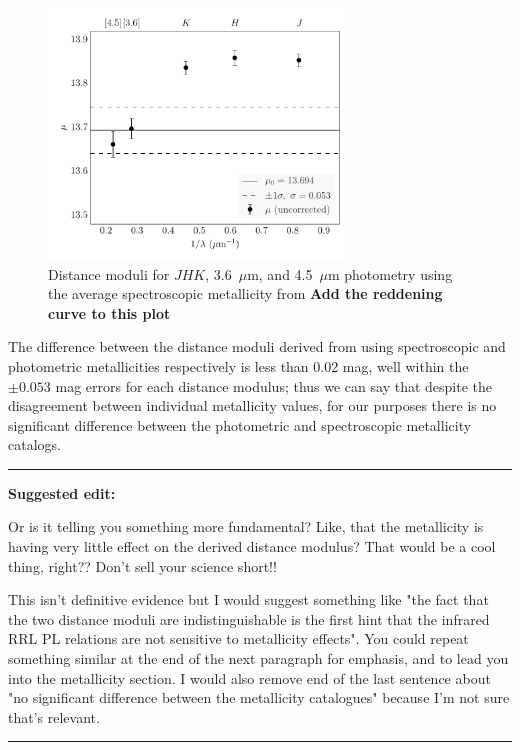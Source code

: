 \documentclass[a4paper,fleqn,usenatbib]{mnras}
\begin{document}
\begin{figure}
\begin{center}
\includegraphics[width=80mm]{final_plots/multiwavelength_distance_samestars_spect.pdf}
\caption{Distance moduli for $J\!H\!K$, 3.6~$\mu$m, and 4.5~$\mu$m photometry using the average spectroscopic metallicity from\citet{2006ApJ...640L..43S} {\bf Add the reddening curve to this plot}}
\label{fig:omegaCen_dist_spect}
\end{center}
\end{figure}


The difference between the distance moduli derived from using spectroscopic and photometric metallicities respectively is less than 0.02 mag, well within the $\pm 0.053$ mag errors for each distance modulus; thus we can say that despite the disagreement between individual metallicity values, for our purposes there is no significant difference between the photometric and spectroscopic metallicity catalogs.

\noindent\rule[0.5ex]{\linewidth}{1pt}
{\bf Suggested edit:} 

Or is it telling you something more fundamental? Like, that the metallicity is having very little effect on the derived distance modulus? That would be a cool thing, right?? Don't sell your science short!!

This isn't definitive evidence but I would suggest something like "the fact that the two distance moduli are indistinguishable is the first hint that the infrared RRL PL relations are not sensitive to metallicity effects". You could repeat something similar at the end of the next paragraph for emphasis, and to lead you into the metallicity section. I would also remove end of the last sentence about "no significant difference between the metallicity catalogues" because I'm not sure that's relevant. 

\noindent\rule[0.5ex]{\linewidth}{1pt}
\end{document}
